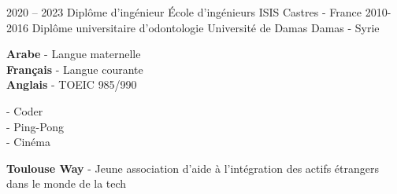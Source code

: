\documentclass[9pt]{developercv} %
\begin{document}

\begin{entrylist}
	\entry
		{2020 -- 2023}
		{Diplôme d’ingénieur}
		{École d'ingénieurs ISIS}
		{Castres - France}
	\entry
		{2010-2016}
		{Diplôme universitaire d’odontologie}
		{Université de Damas}
		{Damas - Syrie}
\end{entrylist}


\begin{minipage}[t]{0.3\textwidth}
	\vspace{-\baselineskip} %

	
	\textbf{Arabe} - Langue maternelle\\
	\textbf{Français} - Langue courante\\
	\textbf{Anglais} - TOEIC 985/990
\end{minipage}
\hfill
\begin{minipage}[t]{0.3\textwidth}
	\vspace{-\baselineskip} %
	

	- Coder\\
	- Ping-Pong\\
	- Cinéma
\end{minipage}
\hfill
\begin{minipage}[t]{0.3\textwidth}
	\vspace{-\baselineskip} %
	
	
	\textbf{Toulouse Way} - Jeune association d'aide à l'intégration des actifs étrangers dans le monde de la tech 
\end{minipage}

\end{document}
